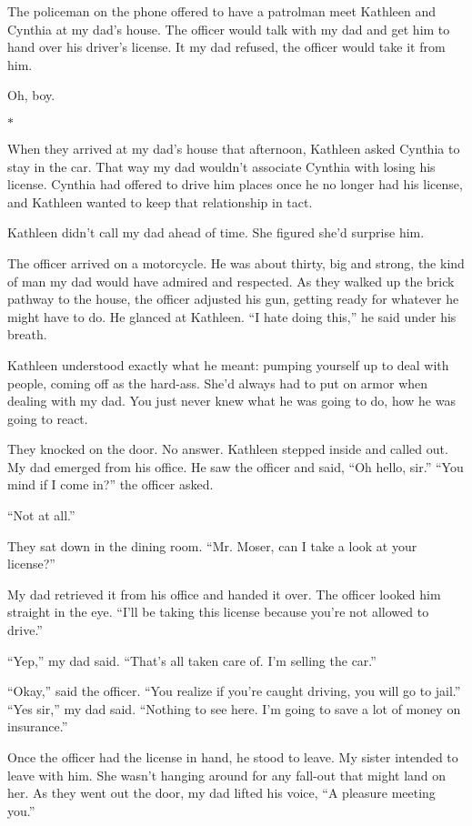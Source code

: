 \documentclass[12pt]{book}
\begin{document}
The policeman on the phone offered to have a patrolman meet Kathleen and Cynthia at my dad's house. The officer would talk with my dad and get him to hand over his driver's license. It my dad refused, the officer would take it from him.

Oh, boy.

\begin{center}$*$\end{center}

When they arrived at my dad's house that afternoon, Kathleen asked Cynthia to stay in the car. That way my dad wouldn't associate Cynthia with losing his license. Cynthia had offered to drive him places once he no longer had his license, and Kathleen wanted to keep that relationship in tact.

Kathleen didn't call my dad ahead of time. She figured she'd surprise him.

The officer arrived on a motorcycle. He was about thirty, big and strong, the kind of man my dad would have admired and respected. As they walked up the brick pathway to the house, the officer adjusted his gun, getting ready for whatever he might have to do. He glanced at Kathleen. ``I hate doing this,'' he said under his breath.

Kathleen understood exactly what he meant: pumping yourself up to deal with people, coming off as the hard-ass. She'd always had to put on armor when dealing with my dad. You just never knew what he was going to do, how he was going to react.

They knocked on the door. No answer. Kathleen stepped inside and called out. My dad emerged from his office. He saw the officer and said, ``Oh hello, sir.'' ``You mind if I come in?'' the officer asked.

``Not at all.''

They sat down in the dining room. ``Mr. Moser, can I take a look at your license?''

My dad retrieved it from his office and handed it over. The officer looked him straight in the eye. ``I'll be taking this license because you're not allowed to drive.''

``Yep,'' my dad said. ``That's all taken care of. I'm selling the car.''

``Okay,'' said the officer. ``You realize if you're caught driving, you will go to jail.'' ``Yes sir,'' my dad said. ``Nothing to see here. I'm going to save a lot of money on insurance.''

Once the officer had the license in hand, he stood to leave. My sister intended to leave with him. She wasn't hanging around for any fall-out that might land on her. As they went out the door, my dad lifted his voice, ``A pleasure meeting you.''
\end{document}
